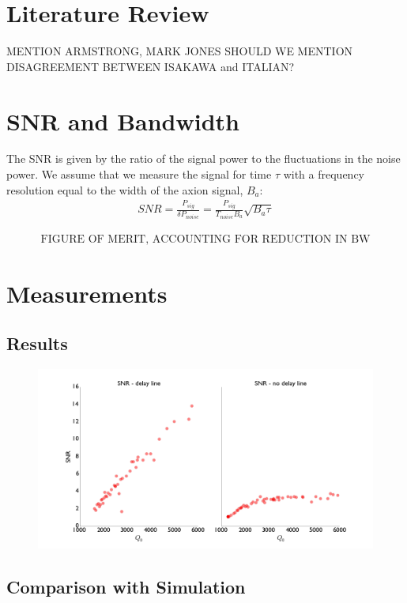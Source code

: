 \documentclass[aps,prl,twocolumn,groupedaddress]{revtex4-1}
\begin{document}
\section{Literature Review}

MENTION ARMSTRONG, MARK JONES
SHOULD WE MENTION DISAGREEMENT BETWEEN ISAKAWA and ITALIAN?

\section{SNR and Bandwidth}
The SNR is given by the ratio of the signal power to the fluctuations in the noise power. We assume that we measure the signal for time $\tau$ with a frequency resolution equal to the width of the axion signal, $B_a$:
\begin{align}
SNR = \frac{P_{sig}}{\delta P_{noise}} = \frac{P_{sig}}{T_{noise}B_a}\sqrt{B_a \tau}
\end{align}

\begin{align}
\text{FIGURE OF MERIT, ACCOUNTING FOR REDUCTION IN BW}
\end{align}

\section{Measurements}

\subsection{Results}

\begin{figure}[htbp]
\centering
\includegraphics[width=\textwidth]{figs/summary_plots}
\caption{}
\label{fig:summary_plots}
\end{figure}

\subsection{Comparison with Simulation}
\end{document}
